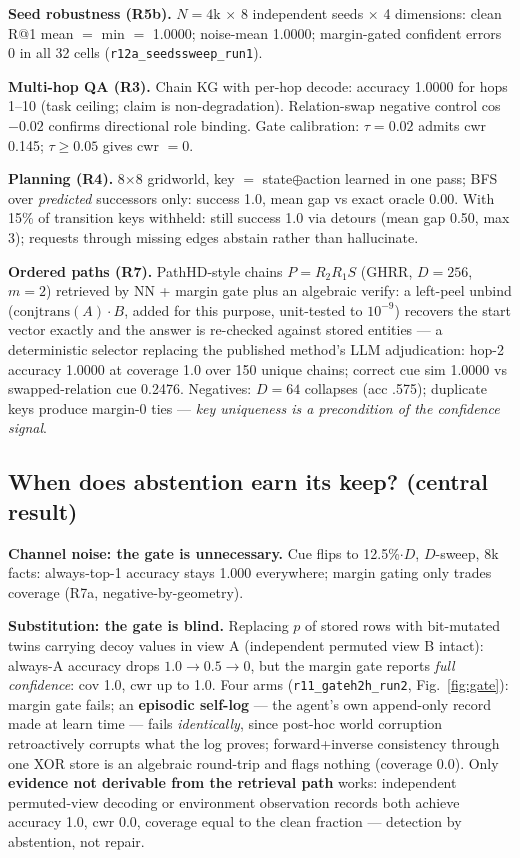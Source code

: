 \documentclass[10pt,twocolumn]{article}
\begin{document}
\textbf{Seed robustness (R5b).} $N{=}4$k $\times$ 8 independent seeds $\times$ 4 dimensions: clean R@1 mean ${=}$ min ${=}$ 1.0000; noise-mean 1.0000; margin-gated confident errors 0 in all 32 cells (\texttt{r12a\_seedssweep\_run1}).

\textbf{Multi-hop QA (R3).} Chain KG with per-hop decode: accuracy 1.0000 for hops 1--10 (task ceiling; claim is non-degradation). Relation-swap negative control cos ${-}0.02$ confirms directional role binding. Gate calibration: $\tau{=}0.02$ admits cwr 0.145; $\tau{\ge}0.05$ gives cwr ${=}0$.

\textbf{Planning (R4).} 8$\times$8 gridworld, key $=$ state$\oplus$action learned in one pass; BFS over \emph{predicted} successors only: success 1.0, mean gap vs exact oracle 0.00. With 15\% of transition keys withheld: still success 1.0 via detours (mean gap 0.50, max 3); requests through missing edges abstain rather than hallucinate.

\textbf{Ordered paths (R7).} PathHD-style chains $P{=}R_2R_1S$ (GHRR, $D{=}256$, $m{=}2$) retrieved by NN + margin gate plus an algebraic verify: a left-peel unbind ($\mathrm{conjtrans}(A)\cdot B$, added for this purpose, unit-tested to $10^{-9}$) recovers the start vector exactly and the answer is re-checked against stored entities --- a deterministic selector replacing the published method's LLM adjudication: hop-2 accuracy 1.0000 at coverage 1.0 over 150 unique chains; correct cue sim 1.0000 vs swapped-relation cue 0.2476. Negatives: $D{=}64$ collapses (acc .575); duplicate keys produce margin-0 ties --- \emph{key uniqueness is a precondition of the confidence signal}.

\subsection{When does abstention earn its keep? (central result)}
\textbf{Channel noise: the gate is unnecessary.} Cue flips to 12.5\%$\cdot D$, $D$-sweep, 8k facts: always-top-1 accuracy stays 1.000 everywhere; margin gating only trades coverage (R7a, negative-by-geometry).

\textbf{Substitution: the gate is blind.} Replacing $p$ of stored rows with bit-mutated twins carrying decoy values in view A (independent permuted view B intact): always-A accuracy drops $1.0{\to}0.5{\to}0$, but the margin gate reports \emph{full confidence}: cov 1.0, cwr up to 1.0. Four arms (\texttt{r11\_gateh2h\_run2}, Fig.~\ref{fig:gate}): margin gate fails; an \textbf{episodic self-log} --- the agent's own append-only record made at learn time --- fails \emph{identically}, since post-hoc world corruption retroactively corrupts what the log proves; forward+inverse consistency through one XOR store is an algebraic round-trip and flags nothing (coverage 0.0). Only \textbf{evidence not derivable from the retrieval path} works: independent permuted-view decoding or environment observation records both achieve accuracy 1.0, cwr 0.0, coverage equal to the clean fraction --- detection by abstention, not repair.
\end{document}
